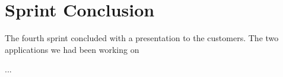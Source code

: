 
\chapter{Sprint Conclusion}
\label{cha:conclusion_sprint_4}

The fourth sprint concluded with a presentation to the customers. The two applications we had been working on 


 ... 
